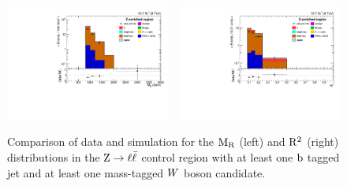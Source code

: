 \begin{figure}[htpb]
\centering
\includegraphics[width=0.48\textwidth]{figures/razor_selection/plots/DataMC_MR_g1Mbg1Y2l0ol_width}
~
\includegraphics[width=0.48\textwidth]{figures/razor_selection/plots/DataMC_R2_g1Mbg1Y2l0ol_width}
\caption{Comparison of data and simulation for the $\mathrm{M_R}$ (left) and $\mathrm{R^2}$ (right) distributions in
the $\mathrm{Z}\rightarrow \ell \bar{\ell}$ control region with at least one $\mathrm{b}$ tagged jet and at
least one mass-tagged $W$ boson candidate. 
\label{fig:DataMC_ZCR}}
\end{figure}

